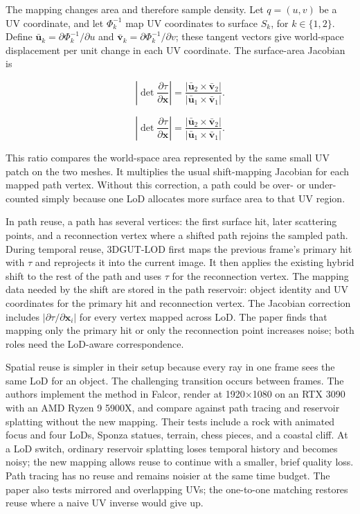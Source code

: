 The mapping changes area and therefore sample density. Let \(q=(u,v)\) be a UV coordinate, and let \(\Phi_k^{-1}\) map UV coordinates to surface \(S_k\), for \(k\in\{1,2\}\). Define \(\bar{\mathbf{u}}_k=\partial\Phi_k^{-1}/\partial u\) and \(\bar{\mathbf{v}}_k=\partial\Phi_k^{-1}/\partial v\); these tangent vectors give world-space displacement per unit change in each UV coordinate. The surface-area Jacobian is

\[\left|\det\frac{\partial\tau}{\partial\mathbf{x}}\right|=\frac{|\bar{\mathbf{u}}_2\times\bar{\mathbf{v}}_2|}{|\bar{\mathbf{u}}_1\times\bar{\mathbf{v}}_1|}.\]

\[\left|\det\frac{\partial\tau}{\partial\mathbf{x}}\right|=\frac{|\bar{\mathbf{u}}_2\times\bar{\mathbf{v}}_2|}{|\bar{\mathbf{u}}_1\times\bar{\mathbf{v}}_1|}.\]

This ratio compares the world-space area represented by the same small UV patch on the two meshes. It multiplies the usual shift-mapping Jacobian for each mapped path vertex. Without this correction, a path could be over- or under-counted simply because one LoD allocates more surface area to that UV region.

In path reuse, a path has several vertices: the first surface hit, later scattering points, and a reconnection vertex where a shifted path rejoins the sampled path. During temporal reuse, 3DGUT-LOD first maps the previous frame's primary hit with \(\tau\) and reprojects it into the current image. It then applies the existing hybrid shift to the rest of the path and uses \(\tau\) for the reconnection vertex. The mapping data needed by the shift are stored in the path reservoir: object identity and UV coordinates for the primary hit and reconnection vertex. The Jacobian correction includes \(|\partial\tau/\partial\mathbf{x}_i|\) for every vertex mapped across LoD. The paper finds that mapping only the primary hit or only the reconnection point increases noise; both roles need the LoD-aware correspondence.

Spatial reuse is simpler in their setup because every ray in one frame sees the same LoD for an object. The challenging transition occurs between frames. The authors implement the method in Falcor, render at 1920×1080 on an RTX 3090 with an AMD Ryzen 9 5900X, and compare against path tracing and reservoir splatting without the new mapping. Their tests include a rock with animated focus and four LoDs, Sponza statues, terrain, chess pieces, and a coastal cliff. At a LoD switch, ordinary reservoir splatting loses temporal history and becomes noisy; the new mapping allows reuse to continue with a smaller, brief quality loss. Path tracing has no reuse and remains noisier at the same time budget. The paper also tests mirrored and overlapping UVs; the one-to-one matching restores reuse where a naive UV inverse would give up.

